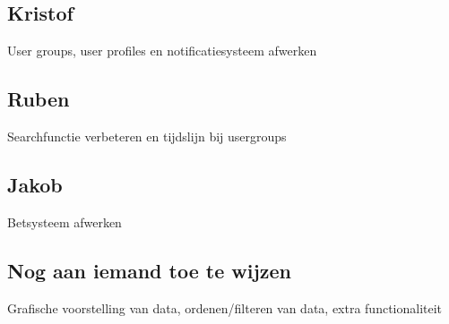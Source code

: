 \documentclass[11pt, a4paper]{article}
\begin{document}
\subsection{Kristof}
User groups, user profiles en notificatiesysteem afwerken
\subsection{Ruben}
Searchfunctie verbeteren en tijdslijn bij usergroups
\subsection{Jakob}
Betsysteem afwerken
\subsection{Nog aan iemand toe te wijzen}
Grafische voorstelling van data, ordenen/filteren van data, extra functionaliteit
\end{document}
